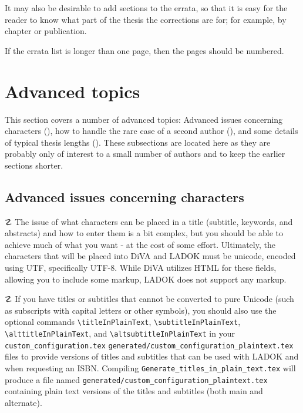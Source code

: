 \documentclass[12pt, twoside]{article}
\newcommand{\fname}[1]{\texttt{#1}}
\begin{document}
It may also be desirable to add sections to the errata, so that it is easy for the reader to know what part of the thesis the corrections are for; for example, by chapter or publication.

If the errata list is longer than one page, then the pages should be numbered.

\section{Advanced topics}
\label{sec:advancedTopics}

This section covers a number of advanced topics: Advanced issues concerning characters (), how to handle the rare case of a second author (), and some details of typical thesis lengths (). These subsections are located here as they are probably only of interest to a small number of authors and to keep the earlier sections shorter.

\subsection{Advanced issues concerning characters}
\label{sec:advancedIssuesConcerningCharacters}
\noindent $☡$ The issue of what characters can be placed in a title (subtitle, keywords, and abstracts) and how to enter them is a bit complex, but you should be able to achieve much of what you want - at the cost of some effort.
Ultimately, the characters that will be placed into \gls{DiVA} and \gls{LADOK} must be unicode, encoded using \gls{UTF}, specifically UTF-8. While \gls{DiVA} utilizes \gls{HTML} for these fields, allowing you to include some markup, \gls{LADOK} does not support any markup.

\noindent $☡$ If you have titles or subtitles that cannot be converted to pure Unicode (such as subscripts with capital letters or other symbols), you should also use the optional commands \texttt{\textbackslash titleInPlainText}, \texttt{\textbackslash subtitleInPlainText}, \texttt{\textbackslash alttitleInPlainText}, and \texttt{\textbackslash altsubtitleInPlainText} in your \fname{custom\_configuration.tex}  \fname{generated/custom\_configuration\_plaintext.tex} files to provide versions of titles and subtitles that can be used with \gls{LADOK} and when requesting an \gls{ISBN}. Compiling \fname{Generate\_titles\_in\_plain\_text.tex} will produce a file named \fname{generated/custom\_configuration\_plaintext.tex} containing plain text versions of the \mbox{titles} and subtitles (both main and alternate).
\end{document}
